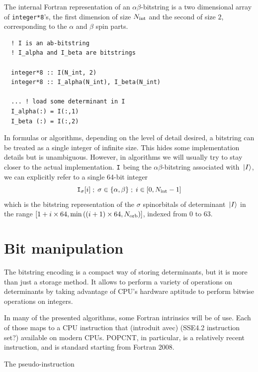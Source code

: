 The internal Fortran representation of an $\alpha \beta$-bitstring is a two dimensional array of \lstinline{integer*8}'s, the first dimension of size ${N_\text{int}}$ and the second of size $2$, corresponding to the $\alpha$ and $\beta$ spin parts.


\begin{lstlisting}
  ! I is an ab-bitstring
  ! I_alpha and I_beta are bitstrings
  
  integer*8 :: I(N_int, 2)
  integer*8 :: I_alpha(N_int), I_beta(N_int)

  ... ! load some determinant in I
  I_alpha(:) = I(:,1)
  I_beta (:) = I(:,2)
\end{lstlisting}


In formulas or algorithms, depending on the level of detail desired, a bitstring can be treated as a single integer of infinite size. This hides some implementation details but is unambiguous. However, in algorithms we will usually try to stay closer to the actual implementation. ${\texttt{I}}$ being the $\alpha \beta$-bitstring associated with ${\ket*{I}}$, we can explicitly refer to a single 64-bit integer
$${\texttt{I}}_{\sigma}[i]\; ;\; \sigma \in \{\alpha, \beta\}\; ;\; i \in [0, {N_\text{int}}-1]$$
which is the bitstring representation of the $\sigma$ spinorbitals of determinant ${\ket*{I}}$ in the range $[1+i \times 64, \min \left( (i+1) \times 64, {N_\text{orb}} \right)]$, indexed from $0$ to $63$.

      

\section{Bit manipulation}

The bitstring encoding is a compact way of storing determinants, but it is more than just a storage method. It allows to perform a variety of operations on determinants by taking advantage of CPU's hardware aptitude to perform bitwise operations on integers.

In many of the presented algorithms, some Fortran intrinsics will be of use. Each of those maps to a CPU instruction that (introduit avec) (SSE4.2 instruction set?) available on modern CPUs. POPCNT, in particular, is a relatively recent instruction, and is standard starting from Fortran 2008.
      
The pseudo-instruction

